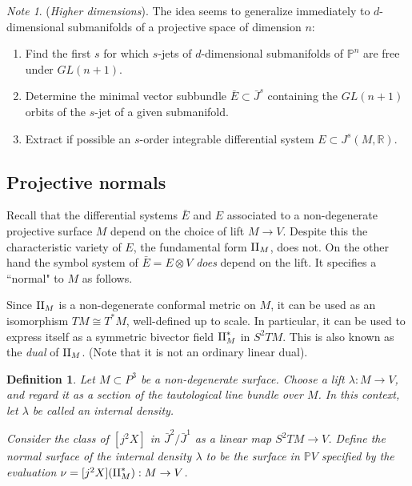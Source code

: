 \documentclass[11pt]{article}
\numberwithin{equation}{section}
\newcounter{count}
\theoremstyle{plain}
\newtheorem{definition}[count]{Definition}
\theoremstyle{remark}
\newtheorem{note}[count]{Note}
\renewcommand{\P}{\mathbb{P}}
\newcommand{\GL}{GL}
\newcommand{\R}{\mathbb{R}}
\newcommand{\II}{\textnormal{II}}
\begin{document}
\begin{note} (\emph{Higher dimensions}). The idea seems to generalize immediately to $d$-dimensional submanifolds of a projective space of dimension $n$:
\begin{enumerate}
\itemsep0em
\item{Find the first $s$ for which $s$-jets of $d$-dimensional submanifolds of $\P^{n}$ are free under $\GL(n+1)$.}
\item{Determine the minimal vector subbundle $\bar{E}\subset \bar{J}^{s}$ containing the $\GL(n+1)$ orbits of the $s$-jet of a given submanifold.}
\item{Extract if possible an $s$-order integrable differential system $E\subset J^{s}(M,\R)$.}
\end{enumerate}
\end{note}

\subsection{Projective normals}

Recall that the differential systems $\bar{E}$ and $E$ associated to a non-degenerate projective surface $M$ depend on the choice of lift $M\rightarrow V$. Despite this the characteristic variety of $E$, the fundamental form $\II_M$, does not. On the other hand the symbol system of $\bar{E}=E\otimes V$ \emph{does} depend on the lift. It specifies a ``normal" to $M$ as follows.

Since $\II_M$ is a non-degenerate conformal metric on $M$, it can be used as an isomorphism $TM\cong T^{*}M$, well-defined up to scale. In particular, it can be used to express itself as a symmetric bivector field $\II_M^{*}$ in $S^{2}TM$. This is also known as the \emph{dual} of $\II_M$. (Note that it is not an ordinary linear dual).

\begin{definition} Let $M\subset P^{3}$ be a non-degenerate surface. Choose a lift $\lambda:M\rightarrow  V$, and regard it as a section of the tautological line bundle over $M$. In this context, let $\lambda$ be called an \emph{internal density}.

Consider the class of $[j^{2}X]$ in $\bar{J}^{2}/\bar{J}^{1}$ as a linear map $S^{2}TM\rightarrow  V$. Define the \emph{normal surface of the internal density $\lambda$} to be the surface in $\P V$ specified by the evaluation $\nu=[j^{2}X](\II_{M}^{*}):M\rightarrow  V$.
\end{definition}
\end{document}
